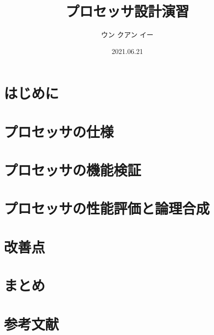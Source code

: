 \documentclass[a4paper, 12pt]{jsarticle}
\title{プロセッサ設計演習}
\author{ウン クアン イー}
\date{2021.06.21}
\begin{document}
  
  \maketitle

  \section{はじめに}
  

  \section{プロセッサの仕様}
  

  \section{プロセッサの機能検証}
  

  \section{プロセッサの性能評価と論理合成}
  

  \section{改善点}
  

  \section{まとめ}
  

  \section*{参考文献}
  
\end{document}
